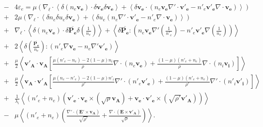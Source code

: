 \begin{eqnarray} %
  \label{eq:turb_bi_Re} &-&4 \varepsilon_e = \mu\left( \nabla_{\boldsymbol{\ell}} \cdot\left<  \delta \left(n_e \boldsymbol{v_e}\right) \cdot \delta \boldsymbol{v_e}\delta \boldsymbol{v_e} \right> +\left<\delta \boldsymbol{v_e}\cdot \left(n_e \boldsymbol{v_e}   \nabla' \cdot \boldsymbol{v'_e}- n'_e \boldsymbol{v'_e} \nabla \cdot \boldsymbol{v_e}\right)\right>\right) \nonumber \\ %
  &+& 2  \mu \left(\nabla_{\boldsymbol{\ell}} \cdot\left<  \delta n_e  \delta u_e\delta \boldsymbol{v_e} \right> +\left<\delta u_e  \left(n_e \nabla' \cdot \boldsymbol{v'_e}- n'_e \nabla \cdot \boldsymbol{v_e}\right)\right> \right) \nonumber\\ %
  &+& \nabla_{\boldsymbol{\ell}} \cdot\left<  \delta \left(n_e \boldsymbol{v_e}\right) \cdot \delta \overline{\boldsymbol{P_e}} \delta \left(\frac{1}{n_e}\right)\right> + \left<\delta \overline{\boldsymbol{P_e}} : \left(n_e \boldsymbol{v_e}  \nabla' \left(\frac{1}{n'_e}\right) - n'_e \boldsymbol{v'_e} \nabla \left(\frac{1}{n_e}\right)\right)\right> \nonumber \\ %
  &+& 2 \left<\delta \left(\frac{\overline{\boldsymbol{P_e}}}{n_e}\right) : \left(n'_e \nabla\boldsymbol{v_e} - n_e \nabla' \boldsymbol{v'_e}\right) \right>  \nonumber\\ %
  &+&\frac{\mu}{2} \left<   \boldsymbol{v'_A} \cdot \boldsymbol{v_{A}}  \left[ \frac{\mu\left(n'_e - n_e\right) -2 \left(1-\mu\right) n_i}{\rho} \nabla \cdot \left(n_e \boldsymbol{v_e}\right)+ \frac{\left(1-\mu\right) \left(n'_e + n_e\right) }{\rho}\nabla \cdot \left(n_i \boldsymbol{v_i}\right)  \right] \right>\nonumber \\ %
  &+& \frac{\mu}{2}\left<  \boldsymbol{v_A} \cdot \boldsymbol{v'_{A}} \left[\frac{\mu\left(n_e - n'_e\right) -2 \left(1-\mu\right) n'_i }{\rho'}\nabla' \cdot \left(n'_e \boldsymbol{v'_e}\right)+ \frac{ \left(1-\mu\right) \left(n'_e + n_e\right) }{\rho'}\nabla' \cdot \left(n'_i \boldsymbol{v'_i}\right)\right]  \right>\nonumber \\ %
  &+& \frac{1}{\lambda_i} \left<\left(n'_e + n_e\right)\left(  \boldsymbol{v'_e} \cdot \boldsymbol{v_e} \times \left(\sqrt{\rho}\boldsymbol{v_A}\right) +  \boldsymbol{v_e} \cdot \boldsymbol{v'_e} \times \left( \sqrt{\rho'}\boldsymbol{v'_A}\right)\right) \right>\nonumber\\ %
  &-& \mu\left< \left(n'_e + n_e\right)  \left( \frac{ \nabla' \cdot \left(\boldsymbol{E'}\times \boldsymbol{v_A}\right) }{\sqrt{\rho'}} + \frac{\nabla \cdot \left(  \boldsymbol{E}\times \boldsymbol{v'_A} \right) }{\sqrt{\rho}}\right)\right> .%
  \end{eqnarray}  %
  
